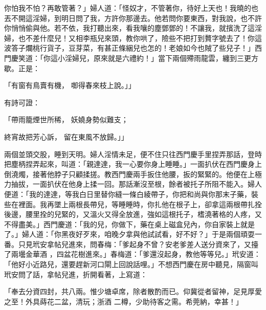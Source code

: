 你怕我不怕？再敢管著？」婦人道：「怪奴才，不管著你，待好上天也！我曉的也丟不開這淫婦，到明日問了我，方許你那邊去。他若問你要東西，對我說，也不許你悄悄偷與他。若不依，我打聽出來，看我嚷的塵鄧鄧的！不讓我，就擯洗了這淫婦，也不差什麼兒！又相李瓶兒來頭，教你哄了，險些不把打到贅字號去了！你這波答子爛桃行貨子，豆芽菜，有甚正條綑兒也怎的！老娘如今也賊了些兒子！」西門慶笑道：「你這小淫婦兒，原來就是六禮約！」當下兩個殢雨龍雲，纏到三更方歇。正是：

「有窗有鳥賣有機，  啣得春來枝上說。」」

有詩可證：

「帶雨籠煙世所稀，  妖嬈身勢似難支；

終宵故把芳心訴，  留在東風不放歸。」」

兩個並頭交股，睡到天明。婦人淫情未足，便不住只往西門慶手里捏弄那話，登時把塵柄捏弄起來，叫道：「親達達，我一心要你身上睡睡。」一面扒伏在西門慶身上倒澆燭，接著他脖子只顧揉搓。教西門慶兩手扳住他腰，扳的緊緊的。他便在上極力抽拔，一面扒伏在他身上揉一回。那話漸沒至根，餘者被托子所阻不能入。婦人便道：「我的達達，等我白日里替你縫一條白綾帶子，你把和尚與你那末子藥，裝些在裡面。我再墜上兩根長帶兒，等睡睡時，你扎他在根子上，卻拿這兩根帶扎拴後邊，腰里拴的兒緊的，又溫火又得全放進，強如這根托子，榰澆著格的人疼，又不得盡美。」西門慶道：「我的兒，你做下，藥在桌上磁盒兒內，你自家裝上就是了。」婦人道：「你黑夜好歹來，咱晚夕拿與他試試看，好不好？」于是兩個頑耍一番。只見玳安拿帖兒進來，問春梅：「爹起身不曾？安老爹差人送分資來了，又擡了兩壜金華酒 ，四盆花樹進來。」春梅道：「爹還沒起身，教他等等兒。」玳安道：「他好小近路兒，還要趕新河口閘上回說話哩。」不想西門慶在房中聽見，隔窗叫玳安問了話，拿帖兒進，折開看著，上寫道：

「奉去分資四封，共八兩。惟少塘卓席，除者散酌而已。仰冀從者留神，足見厚愛之至！外具蒔花二盆，清玩；浙酒 二樽，少助待客之需。希莞納，幸甚！」

